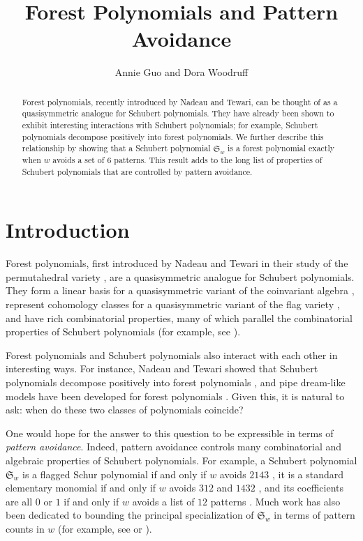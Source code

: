 \documentclass{article}
\title{Forest Polynomials and Pattern Avoidance}
\author{Annie Guo and Dora Woodruff}
\date{}
\theoremstyle{definition} %
\begin{document}
\maketitle

\begin{abstract}
    Forest polynomials, recently introduced by Nadeau and Tewari, can be thought of as a quasisymmetric analogue for Schubert polynomials. They have already been shown to exhibit interesting interactions with Schubert polynomials; for example, Schubert polynomials decompose positively into forest polynomials. We further describe this relationship by showing that a Schubert polynomial $\mathfrak{S}_w$ is a forest polynomial exactly when $w$ avoids a set of $6$ patterns. This result adds to the long list of properties of Schubert polynomials that are controlled by pattern avoidance. 
\end{abstract}

\section{Introduction}

Forest polynomials, first introduced by Nadeau and Tewari in their study of the permutahedral variety \cite{forestpolynomials1}, are a quasisymmetric analogue for Schubert polynomials. They form a linear basis for a quasisymmetric variant of the coinvariant algebra \cite{forestpolynomials1}, represent cohomology classes for a quasisymmetric variant of the flag variety \cite{quasisymmetricflag}, and have rich combinatorial properties, many of which parallel the combinatorial properties of Schubert polynomials (for example, see \cite{quasisymmetricdivideddifferences}). 

Forest polynomials and Schubert polynomials also interact with each other in interesting ways. For instance, Nadeau and Tewari showed that Schubert polynomials decompose positively into forest polynomials \cite{forestpolynomials1}, and pipe dream-like models have been developed for forest polynomials \cite{quasisymmetricdivideddifferences}. Given this, it is natural to ask: when do these two classes of polynomials coincide?

One would hope for the answer to this question to be expressible in terms of \textit{pattern avoidance}. Indeed, pattern avoidance controls many combinatorial and algebraic properties of Schubert polynomials. For example, a Schubert polynomial $\mathfrak{S}_w$ is a flagged Schur polynomial if and only if $w$ avoids $2143$ \cite{LascouxSchutzenberger1985}, it is a standard elementary monomial if and only if $w$ avoids $312$ and $1432$ \cite{singleSEMs}, and its coefficients are all $0$ or $1$ if and only if $w$ avoids a list of $12$ patterns \cite{01Schubert}. Much work has also been dedicated to bounding the principal specialization of $\mathfrak{S}_w$ in terms of pattern counts in $w$ (for example, see \cite{132patterns} or \cite{principalspecializations}). 
\end{document}
